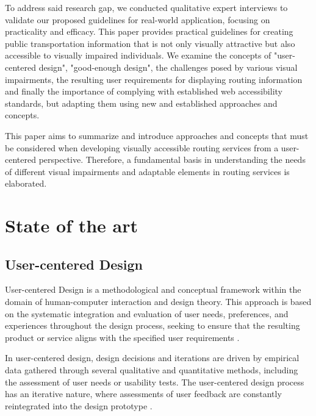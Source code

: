 \documentclass[agile, final]{copernicus-agile}
\begin{document}
To address said research gap, we conducted qualitative expert interviews to validate our proposed guidelines for real-world application, focusing on practicality and efficacy. This paper provides practical guidelines for creating public transportation information that is not only visually attractive but also accessible to visually impaired individuals. We examine the concepts of "user-centered design", "good-enough design", the challenges posed by various visual impairments, the resulting user requirements for displaying routing information and finally the importance of complying with established web accessibility standards, but adapting them using new and established approaches and concepts.

This paper aims to summarize and introduce approaches and concepts that must be considered when developing visually accessible routing services from a user-centered perspective. Therefore, a fundamental basis in understanding the needs of different visual impairments and adaptable elements in routing services is elaborated.  


\section{State of the art}

\subsection{User-centered Design}

User-centered Design is a methodological and conceptual framework within the domain of human-computer interaction and design theory. This approach is based on the systematic integration and evaluation of user needs, preferences, and experiences throughout the design process, seeking to ensure that the resulting product or service aligns with the specified user requirements \citep{KinzieEA2002}.

In user-centered design, design decisions and iterations are driven by empirical data gathered through several qualitative and quantitative methods, including the assessment of user needs or usability tests. The user-centered design process has an iterative nature, where assessments of user feedback are constantly reintegrated into the design prototype \citep{KinzieEA2002}.
\end{document}
